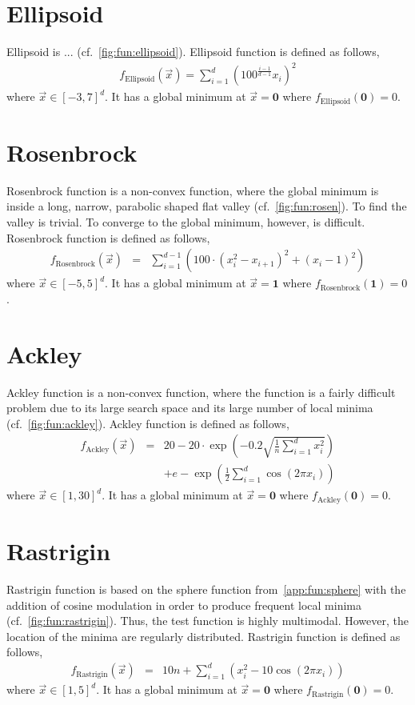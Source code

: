 \section{Ellipsoid}\label{app:fun:ellipsoid}
Ellipsoid is ... (cf.~\cref{fig:fun:ellipsoid}). Ellipsoid function is defined as follows,
\begin{eqnarray}f_{\textrm{Ellipsoid}}(\vec{x})=\sum_{i=1}^d \left(100^{\frac{i-1}{d-1}}x_i\right)^2
\end{eqnarray} where $\vec{x}\in[-3,7]^d$.
It has a global minimum at $\vec{x}=\textbf{0}$ where $f_{\textrm{Ellipsoid}}(\textbf{0})=0$.

\section{Rosenbrock}\label{app:fun:rosen}
Rosenbrock function is a non-convex function, where the global minimum is inside a long, narrow, parabolic shaped flat valley (cf.~\cref{fig:fun:rosen}). To find the valley is trivial. To converge to the global minimum, however, is difficult. Rosenbrock function is defined as follows,
\begin{eqnarray}
f_{\textrm{Rosenbrock}}(\vec{x})&=&\sum_{i=1}^{d-1} \left(100\cdot(x_i^2-x_{i+1})^2+(x_i-1)^2\right)
\end{eqnarray} where $\vec{x}\in[-5,5]^d$. 
It has a global minimum at $\vec{x}=\textbf{1}$ where $f_{\textrm{Rosenbrock}}(\textbf{1})=0$.

\section{Ackley}\label{app:fun:ackley}
Ackley function is a non-convex function, where the function is a fairly difficult problem due to its large search space and its large number of local minima (cf.~\cref{fig:fun:ackley}). Ackley function is defined as follows,
\begin{eqnarray}
f_{\textrm{Ackley}}(\vec{x})&=&20-20\cdot\exp\left(-0.2\sqrt{\frac{1}{n}\sum_{i=1}^d x_i^2}\right)
\\&&+e-\exp\left(\frac{1}{2}\sum_{i=1}^d \cos(2\pi x_i)\right) \nonumber
\end{eqnarray} where $\vec{x}\in[1,30]^d$.
It has a global minimum at $\vec{x}=\textbf{0}$ where $f_{\textrm{Ackley}}(\textbf{0})=0$.

\section{Rastrigin}\label{app:fun:rastrigin}
Rastrigin function is based on the sphere function from~\cref{app:fun:sphere} with the addition of cosine modulation in order to produce frequent local minima (cf.~\cref{fig:fun:rastrigin}). Thus, the test function is highly multimodal. However, the location of the minima are regularly distributed. Rastrigin function is defined as follows,
\begin{eqnarray}
f_{\textrm{Rastrigin}}(\vec{x})&=&10n+\sum_{i=1}^d \left(x_i^2-10\cos(2\pi x_i)\right)
\end{eqnarray} where $\vec{x}\in[1,5]^d$. 
It has a global minimum at $\vec{x}=\textbf{0}$ where $f_{\textrm{Rastrigin}}(\textbf{0})=0$.

